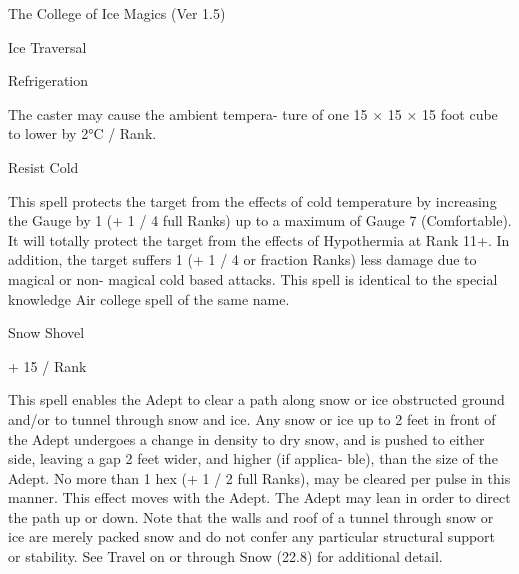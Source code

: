 \begin{Chapter}{The College of Ice Magics (Ver 1.5)}
\begin{spell}[G-4]{Ice Traversal }
\begin{effects}
\end{effects}
\end{spell}

\begin{spell}[G-5]{Refrigeration }

\begin{effects}
The caster may cause the ambient tempera-
ture of one 15 × 15 × 15 foot cube to lower by 2°C 
/ Rank.  

\end{effects}
\end{spell}

\begin{spell}[G-6]{Resist Cold }

\begin{effects}
 This  spell  protects  the  target  from  the 
effects  of  cold  temperature  by  increasing  the 
Gauge by 1 (+ 1 / 4 full Ranks) up to a maximum 
of Gauge 7 (Comfortable). It will totally protect the 
target  from  the  effects  of  Hypothermia  at  Rank 
11+.  In  addition,  the  target  suffers  1  (+  1  /  4  or 
fraction Ranks) less damage due to magical or non-
magical  cold  based  attacks.  This  spell  is  identical 
to  the  special  knowledge  Air  college  spell  of  the 
same name. 

\end{effects}
\end{spell}

\begin{spell}[G-7]{Snow Shovel }

+ 15 / Rank 
\begin{effects}
This spell enables the Adept to clear a path 
along  snow  or  ice  obstructed  ground  and/or  to 
tunnel  through  snow  and  ice.  Any  snow  or  ice  up 
to 2 feet in front of the Adept undergoes a change 
in density to dry snow, and is pushed to either side, 
leaving  a  gap  2  feet  wider,  and  higher  (if  applica-
ble),  than  the  size  of  the  Adept.  No  more  than  1 
hex (+ 1 / 2 full Ranks),  may be cleared per pulse 
in  this  manner.  This  effect  moves  with  the  Adept. 
The  Adept  may  lean  in  order  to  direct the path  up 
or  down.  Note  that  the  walls  and  roof  of  a  tunnel 
through  snow  or  ice  are  merely  packed  snow  and 
do  not  confer  any  particular  structural  support  or 
stability. See Travel on or through Snow (22.8) for 
additional detail. 


\end{effects}
\end{spell}
\end{Chapter}

